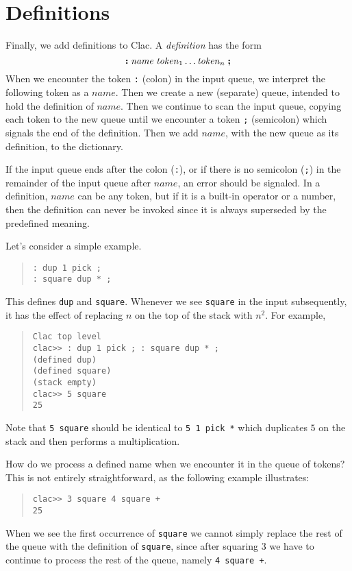 \documentclass[12pt]{exam}
\begin{document}
\section{Definitions}

Finally, we add definitions to Clac. A \emph{definition} has the form
$$
\mbox{\tt\bf :}\;
\mathit{name}\;\mathit{token}_1 \ldots \mathit{token}_n\;
\mbox{\tt\bf ;}
$$
When we encounter the token \lstinline':' (colon) in the input queue,
we interpret the following token as a $\mathit{name}$.  Then we create
a new (separate) queue, intended to hold the definition of
$\mathit{name}$.  Then we continue to scan the input queue, copying
each token to the new queue until we encounter a token \lstinline';'
(semicolon) which signals the end of the definition.  Then we add
$\mathit{name}$, with the new queue as its definition, to the
dictionary.

If the input queue ends after the colon (\lstinline':'), or if there
is no semicolon (\lstinline';') in the remainder of the input queue
after $\mathit{name}$, an error should be signaled.  In a definition,
$\mathit{name}$ can be any token, but if it is a built-in operator or
a number, then the definition can never be invoked since it is always
superseded by the predefined meaning.

Let's consider a simple example.
\begin{quote}
\begin{lstlisting}[language={[clac]C}]
: dup 1 pick ;
: square dup * ;
\end{lstlisting}
\end{quote}
This defines \lstinline'dup' and \lstinline'square'.  Whenever we see
\lstinline'square' in the input subsequently, it has the effect of
replacing $n$ on the top of the stack with $n^2$.  For example,
\begin{quote}
\begin{lstlisting}[language={[clac]C}]
% clac-ref
Clac top level
clac>> : dup 1 pick ; : square dup * ;
(defined dup)
(defined square)
(stack empty)
clac>> 5 square
25
\end{lstlisting}
\end{quote}
Note that \lstinline'5 square' should be identical to \lstinline'5 1 pick *'
which duplicates $5$ on the stack and then performs a multiplication.

\clearpage
How do we process a defined name when we encounter it in the queue of
tokens?  This is not entirely straightforward, as the following
example illustrates:
\begin{quote}
\begin{lstlisting}[language={[clac]C}]
clac>> 3 square 4 square +
25
\end{lstlisting}
\end{quote}
When we see the first occurrence of \lstinline'square' we cannot simply
replace the rest of the queue with the definition of \lstinline'square',
since after squaring $3$ we have to continue to process the rest
of the queue, namely \lstinline'4 square +'.
\end{document}
